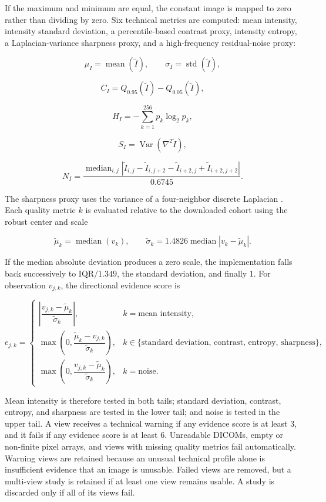 If the maximum and minimum are equal, the constant image is mapped to zero rather than dividing by zero. Six technical metrics are computed: mean intensity, intensity standard deviation, a percentile-based contrast proxy, intensity entropy, a Laplacian-variance sharpness proxy, and a high-frequency residual-noise proxy:

\[
\mu_I=\operatorname{mean}(\widetilde{I}),
\qquad
\sigma_I=\operatorname{std}(\widetilde{I}),
\]

\[
C_I=Q_{0.95}(\widetilde{I})-Q_{0.05}(\widetilde{I}),
\]

\[
H_I=-\sum_{k=1}^{256}p_k\log_2p_k,
\]

\[
S_I=\operatorname{Var}(\nabla^2\widetilde{I}),
\]

\[
N_I
=
\frac{
\operatorname{median}_{i,j}
\left|
\widetilde{I}_{i,j}-\widetilde{I}_{i,j+2}
-\widetilde{I}_{i+2,j}+\widetilde{I}_{i+2,j+2}
\right|
}{0.6745}.
\]

The sharpness proxy uses the variance of a four-neighbor discrete Laplacian \cite{pechpacheco2000diatom}. Each quality metric $k$ is evaluated relative to the downloaded cohort using the robust center and scale

\[
\widetilde{\mu}_k=\operatorname{median}(v_k),
\qquad
\widetilde{\sigma}_k
=
1.4826\operatorname{median}\left|v_k-\widetilde{\mu}_k\right|.
\]

If the median absolute deviation produces a zero scale, the implementation falls back successively to $\mathrm{IQR}/1.349$, the standard deviation, and finally $1$. For observation $v_{j,k}$, the directional evidence score is

\[
e_{j,k}=
\begin{cases}
\left|\dfrac{v_{j,k}-\widetilde{\mu}_k}{\widetilde{\sigma}_k}\right|,
& k=\text{mean intensity},\\[8pt]
\max\!\left(0,\dfrac{\widetilde{\mu}_k-v_{j,k}}{\widetilde{\sigma}_k}\right),
& k\in\{\text{standard deviation, contrast, entropy, sharpness}\},\\[8pt]
\max\!\left(0,\dfrac{v_{j,k}-\widetilde{\mu}_k}{\widetilde{\sigma}_k}\right),
& k=\text{noise}.
\end{cases}
\]

Mean intensity is therefore tested in both tails; standard deviation, contrast, entropy, and sharpness are tested in the lower tail; and noise is tested in the upper tail. A view receives a technical warning if any evidence score is at least $3$, and it fails if any evidence score is at least $6$. Unreadable DICOMs, empty or non-finite pixel arrays, and views with missing quality metrics fail automatically. Warning views are retained because an unusual technical profile alone is insufficient evidence that an image is unusable. Failed views are removed, but a multi-view study is retained if at least one view remains usable. A study is discarded only if all of its views fail.

